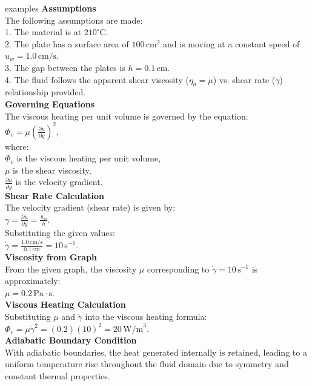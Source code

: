 \documentclass[10pt]{article}
\begin{document}
\begin{multicols*}{4}
\begin{conceptbox}[w]{examples}
	\textbf{Assumptions}\\
	The following assumptions are made:\\
	1. The material is at \(210^\circ \text{C}\).\\
	2. The plate has a surface area of \(100 \, \text{cm}^2\) and is moving at a constant speed of \(u_w = 1.0 \, \text{cm/s}\).\\
	3. The gap between the plates is \(h = 0.1 \, \text{cm}\).\\
	4. The fluid follows the apparent shear viscosity (\(\eta_a = \mu\)) vs. shear rate (\(\dot{\gamma}\)) relationship provided.\\

	\textbf{Governing Equations}\\
	The viscous heating per unit volume is governed by the equation:\\
	\(\Phi_v = \mu \left( \frac{\partial u}{\partial y} \right)^2\),\\
	where:\\
	\(\Phi_v\) is the viscous heating per unit volume,\\
	\(\mu\) is the shear viscosity,\\
	\(\frac{\partial u}{\partial y}\) is the velocity gradient.\\

	\textbf{Shear Rate Calculation}\\
	The velocity gradient (shear rate) is given by:\\
	\(\dot{\gamma} = \frac{\partial u}{\partial y} = \frac{u_w}{h}\).\\
	Substituting the given values:\\
	\(\dot{\gamma} = \frac{1.0 \, \text{cm/s}}{0.1 \, \text{cm}} = 10 \, \text{s}^{-1}\).\\

	\textbf{Viscosity from Graph}\\
	From the given graph, the viscosity \(\mu\) corresponding to \(\dot{\gamma} = 10 \, \text{s}^{-1}\) is approximately:\\
	\(\mu = 0.2 \, \text{Pa}\cdot\text{s}\).\\

	\textbf{Viscous Heating Calculation}\\
	Substituting \(\mu\) and \(\dot{\gamma}\) into the viscous heating formula:\\
	\(\Phi_v = \mu \dot{\gamma}^2 = (0.2) (10)^2 = 20 \, \text{W/m}^3\).\\

	\textbf{Adiabatic Boundary Condition}\\
	With adiabatic boundaries, the heat generated internally is retained, leading to a uniform temperature rise throughout the fluid domain due to symmetry and constant thermal properties.


\end{conceptbox}
\end{multicols*}
\end{document}
